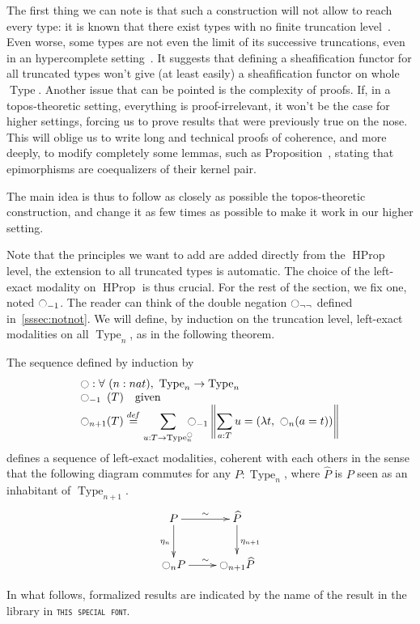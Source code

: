 \documentclass[notfinal]{jfrarticle}
\DeclareMathOperator{\Type}{Type}
\DeclareMathOperator{\HProp}{HProp}
\newcommand \defeq {\overset{de\hspace{-0.2ex}f}{=}}
\newcommand{\modal}{\ensuremath{\ocircle}}
\newcommand{\code}[1]{\texttt{#1}}
\begin{document}
The first thing we can
note is that such a construction will not allow to reach every type:
it is known that there exist types with no finite truncation
level~\cite[Example 8.8.6]{hottbook}. Even worse, some types are not
even the limit of its successive truncations, even in an hypercomplete
setting~\cite{morelvv}. It suggests that defining a sheafification
functor for all truncated types won't give (at least easily) a
sheafification functor on whole $\Type$.
Another issue that can be pointed is the complexity of proofs. If, in
a topos-theoretic setting, everything is proof-irrelevant, it won't be
the case for higher settings, forcing us to prove results that were
previously true on the nose. This will oblige us to write long and
technical proofs of coherence, and more deeply, to modify completely
some lemmas, such as Proposition~\cite[Theorem IV.7.8]{maclanemoerdijk},
stating that epimorphisms are coequalizers of their kernel pair.

The main idea is thus to follow as closely as possible the
topos-theoretic construction, and change it as few times as possible to
make it work in our higher setting.

Note that the principles we want to add are added directly from the
$\HProp$ level, the extension to all truncated types is automatic. The
choice of the left-exact modality on $\HProp$ is thus crucial. For the
rest of the section, we fix one, noted $\modal_{-1}$. The reader can
think of the double negation $\modal_{\lnot\lnot}$ defined
in~\ref{sssec:notnot}. We will define, by induction on the truncation
level, left-exact modalities on all $\Type_n$, as in the following
theorem.

\begin{thm}\label{thm:main}
  The sequence defined by induction by
  \[ \begin{array}{l}
   \modal : \forall \ (n : nat), \ \Type_n \to \Type_n 
   \\
    \modal_{-1\phantom{n}}(T) \quad\text{given} \\

      \displaystyle{\modal_{n+1}(T)} \defeq  
      \displaystyle{\sum_{u:T \to \Type_n^\modal} \!\!\!\!\modal_{-1} 
      \left\|
      \sum_{a:T} u= (\lambda t,~\modal_n (a=t))
      \right\|}
    \end{array}
\]
defines a sequence of left-exact modalities, coherent with each others
in the sense that the following diagram commutes for any $P:\Type_n$,
where $\hat P$ is $P$ seen as an inhabitant of $\Type_{n+1}$.
\[ \xymatrix{
    P \ar@{->}^{\sim}[r] \ar[d]_{\eta_{n}} & \widehat P \ar[d]^{\eta_{n+1}} \\
    \modal_{n} P \ar@{->}^{\sim}[r] & \modal_{n+1} \widehat P 
  } \]
\end{thm}
In what follows, formalized results are indicated by the name of the
result in the library in \code{\textsc{this special font}}.
\end{document}
